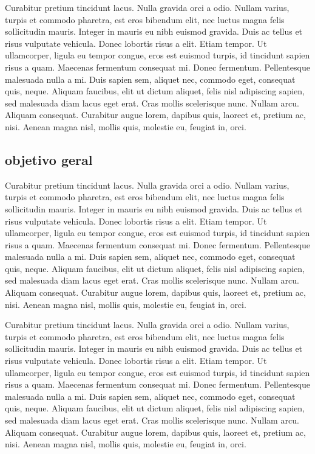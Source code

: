 
Curabitur pretium tincidunt lacus. Nulla gravida orci a odio. Nullam varius, turpis et commodo pharetra, est eros bibendum elit, nec luctus magna felis sollicitudin mauris. Integer in mauris eu nibh euismod gravida. Duis ac tellus et risus vulputate vehicula. Donec lobortis risus a elit. Etiam tempor. Ut ullamcorper, ligula eu tempor congue, eros est euismod turpis, id tincidunt sapien risus a quam. Maecenas fermentum consequat mi. Donec fermentum. Pellentesque malesuada nulla a mi. Duis sapien sem, aliquet nec, commodo eget, consequat quis, neque. Aliquam faucibus, elit ut dictum aliquet, felis nisl adipiscing sapien, sed malesuada diam lacus eget erat. Cras mollis scelerisque nunc. Nullam arcu. Aliquam consequat. Curabitur augue lorem, dapibus quis, laoreet et, pretium ac, nisi. Aenean magna nisl, mollis quis, molestie eu, feugiat in, orci.


\subsection{objetivo geral}
Curabitur pretium tincidunt lacus. Nulla gravida orci a odio. Nullam varius, turpis et commodo pharetra, est eros bibendum elit, nec luctus magna felis sollicitudin mauris. Integer in mauris eu nibh euismod gravida. Duis ac tellus et risus vulputate vehicula. Donec lobortis risus a elit. Etiam tempor. Ut ullamcorper, ligula eu tempor congue, eros est euismod turpis, id tincidunt sapien risus a quam. Maecenas fermentum consequat mi. Donec fermentum. Pellentesque malesuada nulla a mi. Duis sapien sem, aliquet nec, commodo eget, consequat quis, neque. Aliquam faucibus, elit ut dictum aliquet, felis nisl adipiscing sapien, sed malesuada diam lacus eget erat. Cras mollis scelerisque nunc. Nullam arcu. Aliquam consequat. Curabitur augue lorem, dapibus quis, laoreet et, pretium ac, nisi. Aenean magna nisl, mollis quis, molestie eu, feugiat in, orci.

Curabitur pretium tincidunt lacus. Nulla gravida orci a odio. Nullam varius, turpis et commodo pharetra, est eros bibendum elit, nec luctus magna felis sollicitudin mauris. Integer in mauris eu nibh euismod gravida. Duis ac tellus et risus vulputate vehicula. Donec lobortis risus a elit. Etiam tempor. Ut ullamcorper, ligula eu tempor congue, eros est euismod turpis, id tincidunt sapien risus a quam. Maecenas fermentum consequat mi. Donec fermentum. Pellentesque malesuada nulla a mi. Duis sapien sem, aliquet nec, commodo eget, consequat quis, neque. Aliquam faucibus, elit ut dictum aliquet, felis nisl adipiscing sapien, sed malesuada diam lacus eget erat. Cras mollis scelerisque nunc. Nullam arcu. Aliquam consequat. Curabitur augue lorem, dapibus quis, laoreet et, pretium ac, nisi. Aenean magna nisl, mollis quis, molestie eu, feugiat in, orci.


